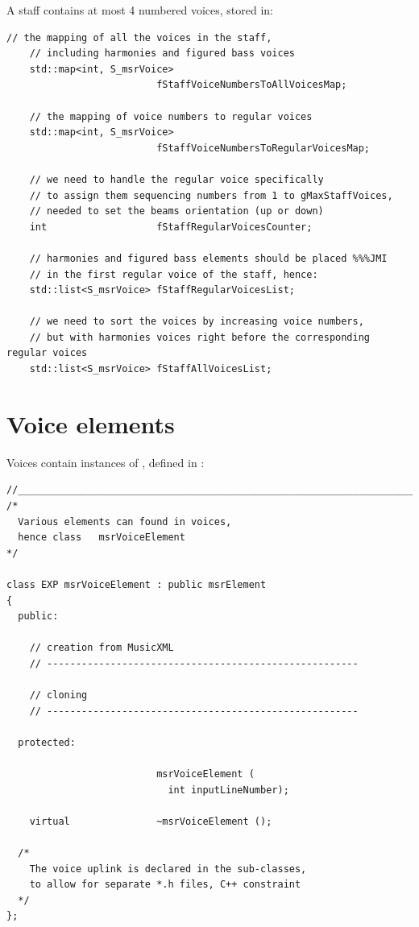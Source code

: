 A staff contains at most 4 numbered voices, stored in:
\begin{lstlisting}[language=CPlusPlus]
    // the mapping of all the voices in the staff,
    // including harmonies and figured bass voices
    std::map<int, S_msrVoice>
                          fStaffVoiceNumbersToAllVoicesMap;

    // the mapping of voice numbers to regular voices
    std::map<int, S_msrVoice>
                          fStaffVoiceNumbersToRegularVoicesMap;

    // we need to handle the regular voice specifically
    // to assign them sequencing numbers from 1 to gMaxStaffVoices,
    // needed to set the beams orientation (up or down)
    int                   fStaffRegularVoicesCounter;

    // harmonies and figured bass elements should be placed %%%JMI
    // in the first regular voice of the staff, hence:
    std::list<S_msrVoice> fStaffRegularVoicesList;

    // we need to sort the voices by increasing voice numbers,
    // but with harmonies voices right before the corresponding regular voices
    std::list<S_msrVoice> fStaffAllVoicesList;
\end{lstlisting}


\section{Voice elements}\label{Voice elements}

Voices contain instances of , defined in :
\begin{lstlisting}[language=CPlusPlus]
//______________________________________________________________________________
/*
  Various elements can found in voices,
  hence class   msrVoiceElement
*/

class EXP msrVoiceElement : public msrElement
{
  public:

    // creation from MusicXML
    // ------------------------------------------------------

    // cloning
    // ------------------------------------------------------

  protected:

                          msrVoiceElement (
                            int inputLineNumber);

    virtual               ~msrVoiceElement ();

  /*
    The voice uplink is declared in the sub-classes,
    to allow for separate *.h files, C++ constraint
  */
};
\end{lstlisting}

